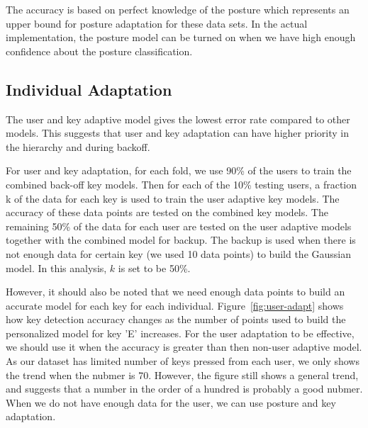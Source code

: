 \documentclass{sigchi}
\begin{document}
The accuracy is based on perfect knowledge of the posture which represents an
upper bound for posture adaptation for these data sets. In the actual 
implementation, the posture model can be turned on when we have high enough 
confidence about the posture classification.

\subsection{Individual Adaptation}
The user and key adaptive model gives the lowest error rate compared to other models. 
This suggests that user and key adaptation can have higher priority in the hierarchy and during
backoff. 

For user and key adaptation, for each fold, we use 90\% of the users to train the
combined back-off key models. Then for each of the 10\% testing users,  a
fraction k of the data for each key is used to train the user adaptive key
models. The accuracy of these data points are tested on the combined key models.
The remaining 50\% of the data for each user are tested on the user adaptive 
models together with the combined model for backup. The backup is used when 
there is not enough data for certain key (we used 10 data points) to build the 
Gaussian model. In this analysis, $k$ is set to be 50\%.

However, it should also be noted that we need enough data points to build an
accurate model for each key for each individual. Figure~\ref{fig:user-adapt}
shows how key detection accuracy changes as the number of points used to build
the personalized model for key 'E' increases. For the user adaptation to be
effective, we should use it when the accuracy is greater than then non-user
adaptive model. As our dataset has limited number of keys
pressed from each user, we only shows the trend when the nubmer is 70. However,
the figure still shows a general trend, and suggests that a number in the order
of a hundred is probably a good nubmer. When we do not have enough data for the
user, we can use posture and key adaptation.
\end{document}
